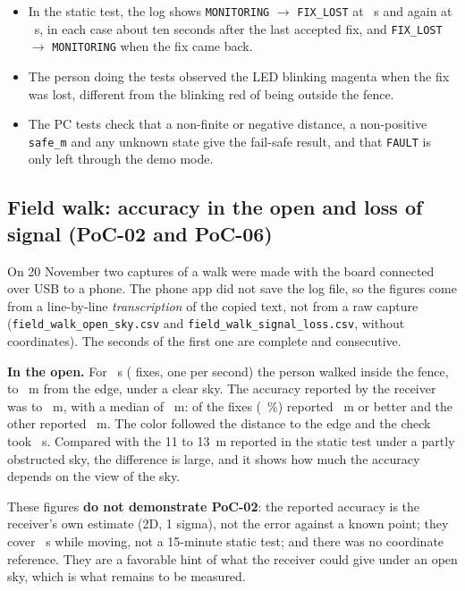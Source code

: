 \begin{itemize}
  \item In the static test, the log shows \texttt{MONITORING} $\to$ \texttt{FIX\_LOST} at \dStaticLostFirstS~s
        and again at \dStaticLostSecondS~s, in each case about ten seconds after the last accepted fix, and
        \texttt{FIX\_LOST} $\to$ \texttt{MONITORING} when the fix came back.
  \item The person doing the tests observed the LED blinking magenta when the fix was lost, different from the
        blinking red of being outside the fence.
  \item The PC tests check that a non-finite or negative distance, a non-positive \texttt{safe\_m} and any
        unknown state give the fail-safe result, and that \texttt{FAULT} is only left through the demo mode.
\end{itemize}

\subsection{Field walk: accuracy in the open and loss of signal (PoC-02 and PoC-06)}

On 20 November two captures of a walk were made with the board connected over USB to a phone. The phone app
did not save the log file, so the figures come from a line-by-line \emph{transcription} of the copied text, not
from a raw capture (\texttt{field\_\allowbreak walk\_\allowbreak open\_\allowbreak sky.csv} and \texttt{field\_\allowbreak walk\_\allowbreak signal\_\allowbreak loss.csv}, without
coordinates). The seconds of the first one are complete and consecutive.

\textbf{In the open.} For \dWalkSeconds~s (\dWalkFixes{} fixes, one per second) the person walked inside the fence,
\dWalkDistMin{} to \dWalkDistMax~m from the edge, under a clear sky. The accuracy reported by the receiver was
\dWalkAccMin{} to \dWalkAccMax~m, with a median of \dWalkAccMedian~m: \dWalkWithin{} of the \dWalkFixes{} fixes
(\dWalkWithinPct~\%) reported \dReqCep~m or better and the other \dWalkAbove{} reported \dWalkAccMax~m. The color
followed the distance to the edge and the check took \dCrossCheckInUs~\textmu s. Compared with the 11 to 13~m
reported in the static test under a partly obstructed sky, the difference is large, and it shows how much the
accuracy depends on the view of the sky.

These figures \textbf{do not demonstrate PoC-02}: the reported accuracy is the receiver's own estimate (2D, 1
sigma), not the error against a known point; they cover \dWalkSeconds~s while moving, not a 15-minute static
test; and there was no coordinate reference. They are a favorable hint of what the receiver could give under an
open sky, which is what remains to be measured.

